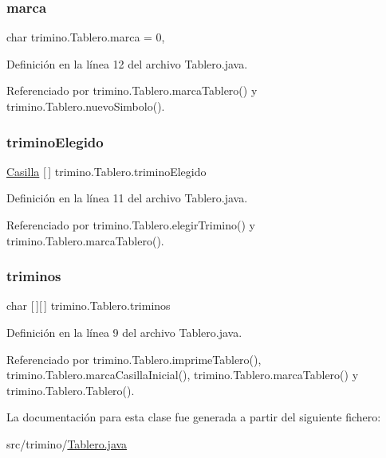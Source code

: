 \subsubsection{\texorpdfstring{marca}{marca}}
{\footnotesize\ttfamily char trimino.\+Tablero.\+marca = \textquotesingle{}0\textquotesingle{}\hspace{0.3cm}{\ttfamily [static]}, {\ttfamily [package]}}



Definición en la línea 12 del archivo Tablero.\+java.



Referenciado por trimino.\+Tablero.\+marca\+Tablero() y trimino.\+Tablero.\+nuevo\+Simbolo().

\mbox{\label{classtrimino_1_1Tablero_ae28469f3840e1b257a45e3002f04cd7a}} 
\subsubsection{\texorpdfstring{triminoElegido}{triminoElegido}}
{\footnotesize\ttfamily \mbox{\hyperlink{classtrimino_1_1Casilla}{Casilla}} \mbox{[}$\,$\mbox{]} trimino.\+Tablero.\+trimino\+Elegido\hspace{0.3cm}{\ttfamily [private]}}



Definición en la línea 11 del archivo Tablero.\+java.



Referenciado por trimino.\+Tablero.\+elegir\+Trimino() y trimino.\+Tablero.\+marca\+Tablero().

\mbox{\label{classtrimino_1_1Tablero_ab8955124b813666eeff506cf3a71c387}} 
\subsubsection{\texorpdfstring{triminos}{triminos}}
{\footnotesize\ttfamily char \mbox{[}$\,$\mbox{]}\mbox{[}$\,$\mbox{]} trimino.\+Tablero.\+triminos\hspace{0.3cm}{\ttfamily [private]}}



Definición en la línea 9 del archivo Tablero.\+java.



Referenciado por trimino.\+Tablero.\+imprime\+Tablero(), trimino.\+Tablero.\+marca\+Casilla\+Inicial(), trimino.\+Tablero.\+marca\+Tablero() y trimino.\+Tablero.\+Tablero().



La documentación para esta clase fue generada a partir del siguiente fichero\+:\begin{DoxyCompactItemize}
\item 
src/trimino/\mbox{\hyperlink{Tablero_8java}{Tablero.\+java}}\end{DoxyCompactItemize}
